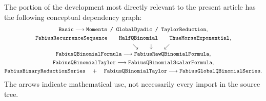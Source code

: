 \documentclass[11pt,oneside]{article}
\theoremstyle{definition}
\theoremstyle{remark}
\begin{document}
The portion of the development most directly relevant to the present article
has the following conceptual dependency graph:
\begin{equation}\label{eq:dependencygraph}
\begin{gathered}
 \texttt{Basic}
 \longrightarrow
 \texttt{Moments / GlobalDyadic / TaylorReduction},\\
 \texttt{FabiusRecurrenceSequence}
 \qquad
 \texttt{HalfQBinomial}
 \qquad
 \texttt{ThueMorseExponential},\\
 \hspace{2.2cm}\searrow\qquad\downarrow\qquad\swarrow\\[-0.2em]
 \texttt{FabiusQBinomialFormula}
 \longrightarrow
 \texttt{FabiusRawQBinomialFormula},\\
 \texttt{FabiusQBinomialTaylor}
 \longrightarrow
 \texttt{FabiusQBinomialScalarFormula},\\
 \texttt{FabiusBinaryReductionSeries}
 \quad+\quad
 \texttt{FabiusQBinomialTaylor}
 \longrightarrow
 \texttt{FabiusGlobalQBinomialSeries}.
\end{gathered}
\end{equation}
The arrows indicate mathematical use, not necessarily every import in the
source tree.
\end{document}

